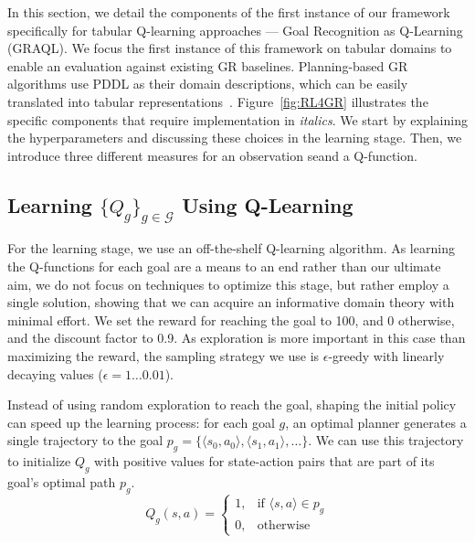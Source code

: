 \documentclass[letterpaper]{article} %
\providecommand\goals{\mathcal{G}}
\begin{document}
In this section, we detail the components of the first instance of our framework specifically for tabular Q-learning approaches --- Goal Recognition as Q-Learning (GRAQL).
We focus the first instance of this framework on tabular domains to enable an evaluation against existing GR baselines. Planning-based GR algorithms use PDDL as their domain descriptions, which can be easily translated into tabular representations~\cite{ramirez2009plan,amado2018goal}.
Figure~\ref{fig:RL4GR} illustrates the specific components that require implementation in \textit{italics}.
We start by explaining the hyperparameters and discussing these choices in the learning stage.
Then, we introduce three different measures for an observation seand a Q-function.

\subsection{Learning $\{Q_g\}_{g\in \goals}$ Using Q-Learning}
For the learning stage, we use an off-the-shelf Q-learning algorithm.
As learning the Q-functions for each goal are a means to an end rather than our ultimate aim, we do not focus on techniques to optimize this stage, but rather employ a single solution, showing that we can acquire an informative domain theory with minimal effort.
We set the reward for reaching the goal to 100, and 0 otherwise, and the discount factor to 0.9.
As exploration is more important in this case than maximizing the reward, the sampling strategy we use is $\epsilon$-greedy with linearly decaying values ($\epsilon = 1 \ldots 0.01$).

Instead of using random exploration to reach the goal, shaping the initial policy can speed up the learning process: for each goal $g$, an optimal planner generates a single trajectory to the goal $p_g = \{\langle s_0, a_0 \rangle, \langle s_1, a_1 \rangle, \ldots \}$.
We can use this trajectory to initialize $Q_g$ with positive values for state-action pairs that are part of its goal's optimal path $p_g$.
\begin{equation}
    Q_g(s,a) =
    \begin{cases}
    1,& \text{if } \langle s,a \rangle \in p_g \\
    0,              & \text{otherwise}
\end{cases}
\end{equation}
\end{document}
